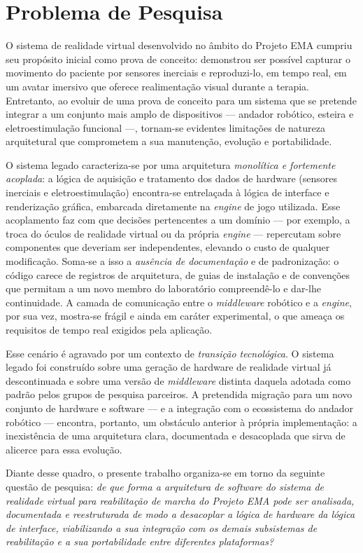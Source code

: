 \section{Problema de Pesquisa}

O sistema de realidade virtual desenvolvido no âmbito do Projeto EMA cumpriu seu
propósito inicial como prova de conceito: demonstrou ser possível capturar o movimento
do paciente por sensores inerciais e reproduzi-lo, em tempo real, em um avatar imersivo
que oferece realimentação visual durante a terapia. Entretanto, ao evoluir de uma prova
de conceito para um sistema que se pretende integrar a um conjunto mais amplo de
dispositivos --- andador robótico, esteira e eletroestimulação funcional ---, tornam-se
evidentes limitações de natureza arquitetural que comprometem a sua manutenção,
evolução e portabilidade.

O sistema legado caracteriza-se por uma arquitetura \emph{monolítica e fortemente
acoplada}: a lógica de aquisição e tratamento dos dados de hardware (sensores inerciais
e eletroestimulação) encontra-se entrelaçada à lógica de interface e renderização
gráfica, embarcada diretamente na \emph{engine} de jogo utilizada. Esse acoplamento faz
com que decisões pertencentes a um domínio --- por exemplo, a troca do óculos de
realidade virtual ou da própria \emph{engine} --- repercutam sobre componentes que
deveriam ser independentes, elevando o custo de qualquer modificação. Soma-se a isso a
\emph{ausência de documentação} e de padronização: o código carece de registros de
arquitetura, de guias de instalação e de convenções que permitam a um novo membro do
laboratório compreendê-lo e dar-lhe continuidade. A camada de comunicação entre o
\emph{middleware} robótico e a \emph{engine}, por sua vez, mostra-se frágil e ainda em
caráter experimental, o que ameaça os requisitos de tempo real exigidos pela aplicação.

Esse cenário é agravado por um contexto de \emph{transição tecnológica}. O sistema
legado foi construído sobre uma geração de hardware de realidade virtual já
descontinuada e sobre uma versão de \emph{middleware} distinta daquela adotada como
padrão pelos grupos de pesquisa parceiros. A pretendida migração para um novo conjunto
de hardware e software --- e a integração com o ecossistema do andador robótico ---
encontra, portanto, um obstáculo anterior à própria implementação: a inexistência de
uma arquitetura clara, documentada e desacoplada que sirva de alicerce para essa
evolução.

Diante desse quadro, o presente trabalho organiza-se em torno da seguinte questão de
pesquisa: \emph{de que forma a arquitetura de software do sistema de realidade virtual
para reabilitação de marcha do Projeto EMA pode ser analisada, documentada e
reestruturada de modo a desacoplar a lógica de hardware da lógica de interface, viabilizando
a sua integração com os demais subsistemas de reabilitação e a sua portabilidade entre
diferentes plataformas?}

